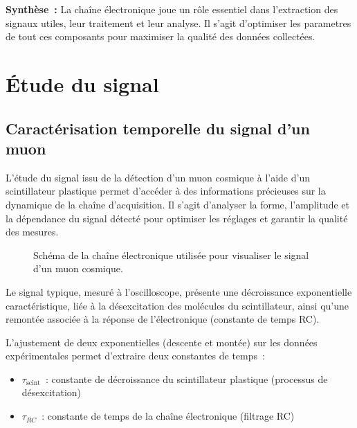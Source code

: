 \documentclass[a4paper,12pt,twoside]{article}
\begin{document}
\begin{remarque}
\textbf{Synthèse~:} La chaîne électronique joue un rôle essentiel dans l’extraction des signaux utiles, leur traitement et leur analyse. Il s'agit d'optimiser les parametres de tout ces composants pour maximiser la qualité des données collectées.
\end{remarque}


\section{Étude du signal}
\subsection{Caractérisation temporelle du signal d’un muon}



\begin{center}
\begin{tcolorbox}[colback=blue!5!white, colframe=blue!60!black, title=Principe de l’étude du signal]
L’étude du signal issu de la détection d’un muon cosmique à l’aide d’un scintillateur plastique permet d’accéder à des informations précieuses sur la dynamique de la chaîne d’acquisition. Il s’agit d’analyser la forme, l’amplitude et la dépendance du signal détecté pour optimiser les réglages et garantir la qualité des mesures.
\end{tcolorbox}
\end{center}


\begin{figure}[H]
  \centering
  
  \caption{Schéma de la chaîne électronique utilisée pour visualiser le signal d’un muon cosmique.}
  \label{fig:scintillator}
\end{figure}

Le signal typique, mesuré à l’oscilloscope, présente une décroissance exponentielle caractéristique, liée à la désexcitation des molécules du scintillateur, ainsi qu’une remontée associée à la réponse de l’électronique (constante de temps RC).

L’ajustement de deux exponentielles (descente et montée) sur les données expérimentales permet d’extraire deux constantes de temps :
\begin{itemize}
    \item $\tau_{\text{scint}}$ : constante de décroissance du scintillateur plastique (processus de désexcitation)
    \item $\tau_{RC}$ : constante de temps de la chaîne électronique (filtrage RC)
\end{itemize}
\end{document}
